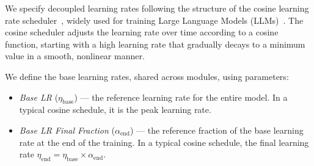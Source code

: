 \documentclass{article} %
\newcommand{\jl}[1]{\textcolor{green}{[JL: #1]}}
\newcommand{\jmr}[2]{\textcolor{purple}{[JM:] \sout{#1} #2}}
\begin{document}
    We specify decoupled learning rates following the structure of the cosine learning rate scheduler~\citep{loshchilov2016sgdr}, widely used for training Large Language Models (LLMs)~\citep{touvron2023llama, hoffmann2022training}. The cosine scheduler adjusts the learning rate over time according to a cosine function, starting with a high learning rate that gradually decays to a minimum value in a smooth, nonlinear manner.



    We define the base learning rates, shared across modules, using parameters:

    \begin{itemize}[topsep=0pt, leftmargin=*] 
    \item \textit{Base LR} ($\eta_{\text{base}}$) --- the reference learning rate for the entire model. In a typical cosine schedule, it is the peak learning rate.

    \item \textit{Base LR Final Fraction} ($\alpha_{\text{end}}$) --- the reference fraction of the base learning rate at the end of the training. In a typical cosine schedule, the final learning rate $\eta_{\text{end}} = \eta_{\text{base}} \times \alpha_{\text{end}}$. %


    \end{itemize}

\end{document}
